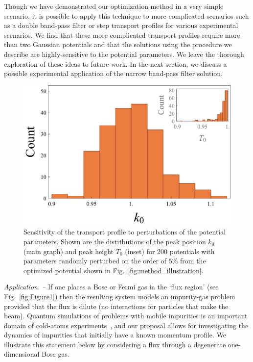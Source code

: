 \documentclass[twocolumn,amsmath,amssymb,showpacs,prl,superscriptaddress,aps]{revtex4-1}
\begin{document}
Though we have demonstrated our optimization method in a very simple scenario, it is possible to apply this technique to more complicated scenarios such as a double band-pass filter or step transport profiles for various experimental scenarios. We find that these more complicated transport profiles require more than two Gaussian potentials and that the solutions using the procedure we describe are highly-sensitive to the potential parameters. We leave the thorough exploration of these ideas to future work. In the next section, we discuss a possible experimental application of the narrow band-pass filter solution. 


\begin{figure}
   \includegraphics[width=1\linewidth]{figures/plot_sensitivity.pdf}
 \caption[Sensitivity Plot]{Sensitivity of the transport profile to perturbations of the potential parameters. Shown are the distributions of the peak position $k_0$ (main graph) and peak height $T_0$ (inset) for 200 potentials with parameters randomly perturbed on the order of $5\%$ from the optimized potential shown in Fig.~\ref{fig:method_illustration}. }
 \label{fig:sensitivity}
\end{figure}



{\it Application. --} If one places a Bose or Fermi gas in the `flux region' (see Fig.~\ref{fig:Figure1}) then the resulting 
system models an impurity-gas problem provided that the flux is dilute (no interactions for particles that make the beam).
Quantum simulations of problems with mobile impurities is an important domain of cold-atoms 
experiments~\cite{zwierlein2009,salomon2009,grimm2012, widera2012, catani2012, fukuhara2013, hu2016,arlt2016,zaccanti2017},
and our proposal allows for investigating the dynamics of impurities that initially have 
a known momentum profile. We illustrate this statement below by considering a flux through a degenerate 
one-dimensional Bose gas. 
\end{document}
